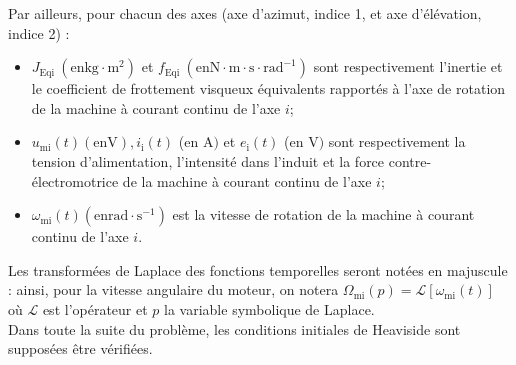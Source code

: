 Par ailleurs, pour chacun des axes (axe d'azimut, indice 1, et axe d'élévation, indice 2) :

\begin{itemize}
  \item $J_{\text {Eqi }}\left(\mathrm{en} \mathrm{kg} \cdot \mathrm{m}^{2}\right)$ et $f_{\text {Eqi }}\left(\mathrm{en} \mathrm{N} \cdot \mathrm{m} \cdot \mathrm{s} \cdot \mathrm{rad}^{-1}\right)$ sont respectivement l'inertie et le coefficient de frottement visqueux équivalents rapportés à l'axe de rotation de la machine à courant continu de l'axe $i$;
  \item $u_{\mathrm{mi}}(t)(\mathrm{en} \mathrm{V}), i_{\mathrm{i}}(t)$ (en A$)$ et $e_{\mathrm{i}}(t)$ (en V$)$ sont respectivement la tension d'alimentation, l'intensité dans l'induit et la force contre-électromotrice de la machine à courant continu de l'axe $i$;
  \item $\omega_{\mathrm{mi}}(t)\left(\mathrm{en} \mathrm{rad} \cdot \mathrm{s}^{-1}\right)$ est la vitesse de rotation de la machine à courant continu de l'axe $i$.
\end{itemize}

Les transformées de Laplace des fonctions temporelles seront notées en majuscule : ainsi, pour la vitesse angulaire du moteur, on notera $\Omega_{\mathrm{mi}}(p)=\mathcal{L}\left[\omega_{\mathrm{mi}}(t)\right]$ où $\mathcal{L}$ est l'opérateur et $p$ la variable symbolique de Laplace.\\
Dans toute la suite du problème, les conditions initiales de Heaviside sont supposées être vérifiées.\\
\ifprof
\begin{corrige}
\end{corrige}
\else
\fi


